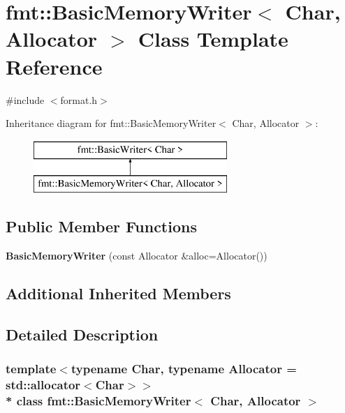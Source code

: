 \hypertarget{classfmt_1_1BasicMemoryWriter}{}\section{fmt\+:\+:Basic\+Memory\+Writer$<$ Char, Allocator $>$ Class Template Reference}
\label{classfmt_1_1BasicMemoryWriter}


{\ttfamily \#include $<$format.\+h$>$}

Inheritance diagram for fmt\+:\+:Basic\+Memory\+Writer$<$ Char, Allocator $>$\+:\begin{figure}[H]
\begin{center}
\leavevmode
\includegraphics[height=2.000000cm]{classfmt_1_1BasicMemoryWriter}
\end{center}
\end{figure}
\subsection*{Public Member Functions}
\begin{DoxyCompactItemize}
\item 
{\bfseries Basic\+Memory\+Writer} (const Allocator \&alloc=Allocator())\hypertarget{classfmt_1_1BasicMemoryWriter_a36ef881adce8fc7a0b3632d2fb66fdfb}{}\label{classfmt_1_1BasicMemoryWriter_a36ef881adce8fc7a0b3632d2fb66fdfb}

\end{DoxyCompactItemize}
\subsection*{Additional Inherited Members}


\subsection{Detailed Description}
\subsubsection*{template$<$typename Char, typename Allocator = std\+::allocator$<$\+Char$>$$>$\\*
class fmt\+::\+Basic\+Memory\+Writer$<$ Char, Allocator $>$}

